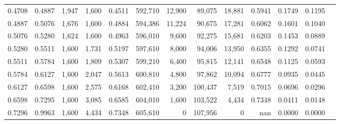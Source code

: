 \begin{tabular}{rrrrrrrrrrrrr}
0.4708 & 0.4887 &  1,947 & 1,600 &                                     0.4511 & 592,710 &  12,900 &  89,075 &  18,881 & 0.5941 & 0.1749 & 0.1195 \\
0.4887 & 0.5076 &  1,676 & 1,600 &                                     0.4884 & 594,386 &  11,224 &  90,675 &  17,281 & 0.6062 & 0.1601 & 0.1040 \\
0.5076 & 0.5280 &  1,624 & 1,600 &                                     0.4963 & 596,010 &   9,600 &  92,275 &  15,681 & 0.6203 & 0.1453 & 0.0889 \\
0.5280 & 0.5511 &  1,600 & 1,731 &                                     0.5197 & 597,610 &   8,000 &  94,006 &  13,950 & 0.6355 & 0.1292 & 0.0741 \\
0.5511 & 0.5784 &  1,600 & 1,809 &                                     0.5307 & 599,210 &   6,400 &  95,815 &  12,141 & 0.6548 & 0.1125 & 0.0593 \\
0.5784 & 0.6127 &  1,600 & 2,047 &                                     0.5613 & 600,810 &   4,800 &  97,862 &  10,094 & 0.6777 & 0.0935 & 0.0445 \\
0.6127 & 0.6598 &  1,600 & 2,575 &                                     0.6168 & 602,410 &   3,200 & 100,437 &   7,519 & 0.7015 & 0.0696 & 0.0296 \\
0.6598 & 0.7295 &  1,600 & 3,085 &                                     0.6585 & 604,010 &   1,600 & 103,522 &   4,434 & 0.7348 & 0.0411 & 0.0148 \\
0.7296 & 0.9963 &  1,600 & 4,434 &                                     0.7348 & 605,610 &       0 & 107,956 &       0 &    nan & 0.0000 & 0.0000 \\
\bottomrule
\end{tabular}
